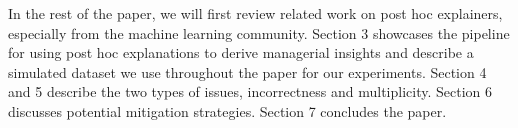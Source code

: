 \documentclass[11pt]{article}    %
\def\pipeline{prediction insight pipeline}
\begin{document}
In the rest of the paper, we will first review related work on post hoc explainers, especially from the machine learning community. Section 3 showcases the pipeline for using post hoc explanations to derive managerial insights and describe a simulated dataset we use throughout the paper for our experiments. Section 4 and 5 describe the two types of issues, incorrectness and multiplicity. Section 6 discusses potential mitigation strategies. Section 7 concludes the paper.



    \vspace{-3mm}
\end{document}
